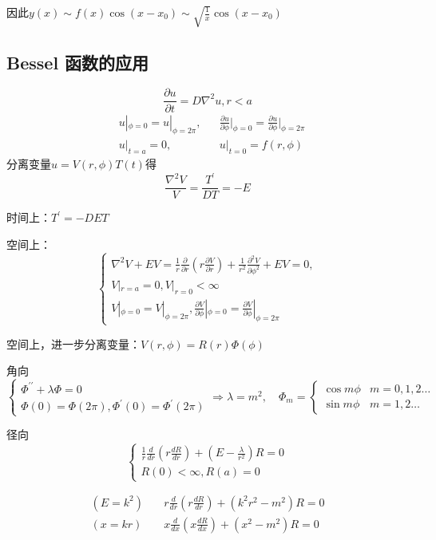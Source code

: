 因此$y(x)\sim f(x)\cos(x-x_{0})\sim\sqrt{\frac{1}{x}}\cos(x-x_{0})$

\subsection{Bessel 函数的应用}
\begin{ex}[扩散问题]
    $$\frac{\partial u}{\partial t}=D\nabla^{2}u,r<a$$
    $$\begin{aligned}
        &u|_{\phi=0}=u|_{\phi=2\pi},&&\frac{\partial u}{\partial\phi}\bigg|_{\phi=0}=\frac{\partial u}{\partial\phi}\bigg|_{\phi=2\pi}\\
        &u|_{t=a}=0,\quad &&u|_{t=0}=f(r,\phi)
    \end{aligned}$$
\noindent 分离变量$u=V(r,\phi)T(t)$得
$$\frac{\nabla^{2}V}{V}=\frac{T^{\prime}}{DT}=-E$$

\noindent 时间上：$T^{\prime}=-DET$

\noindent 空间上：
$$\begin{cases}
    \nabla^{2}V+EV=\frac{1}{r}\frac{\partial}{\partial r}(r\frac{\partial V}{\partial r})+\frac{1}{r^{2}}\frac{\partial^{2}V}{\partial\phi^{2}}+EV=0,\\
    V|_{r=a}=0,V|_{r=0}<\infty\\
    V|_{\phi=0}=V|_{\phi=2\pi},\frac{\partial V}{\partial\phi}|_{\phi=0}=\frac{\partial V}{\partial\phi}|_{\phi=2\pi}
\end{cases}$$

\noindent 空间上，进一步分离变量：$V(r,\phi)=R(r)\Phi(\phi)$

角向
$$\begin{cases}
    \Phi^{\prime\prime}+\lambda\Phi=0\\
    \Phi(0)=\Phi(2\pi),\Phi^{\prime}(0)=\Phi^{\prime}(2\pi)
\end{cases}
\Rightarrow \lambda=m^2,\quad
\Phi_{m}=
\begin{cases}
    \cos m\phi&m=0,1,2\ldots\\
    \sin m\phi&m=1,2\ldots
\end{cases}$$

径向
$$\begin{cases}
    \frac{1}{r}\frac{d}{dr}(r\frac{dR}{dr})+(E-\frac{\lambda}{r^{2}})R=0\\
    R(0)<\infty,R(a)=0
\end{cases}$$

$$\begin{aligned}
(E=k^2) \quad &r\frac{d}{dr}(r\frac{dR}{dr})+(k^{2}r^{2}-m^{2})R=0\\
(x=kr) \quad &x\frac{d}{dx}(x\frac{dR}{dx})+(x^{2}-m^{2})R=0
\end{aligned}$$


\end{ex}
